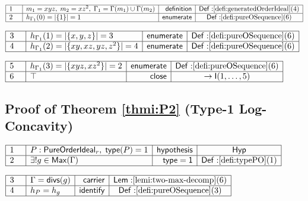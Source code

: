 \documentclass[11pt,reqno]{amsart}
\begin{document}
\noindent$%
\begin{array}{|m{0.5cm}|l|r|c|}
\hline
1 & m_{1}=xyz,\;m_{2}=xz^{2},\;\Gamma_{1}=\Gamma(m_{1})\cup\Gamma(m_{2}) & 
\mathsf{definition} & \mathsf{Def:}\ref{defi:generatedOrderIdeal}(4) \\ 
\hline
2 & h_{\Gamma_{1}}(0)=|\{1\}|=1 & \mathsf{enumerate} & \mathsf{Def:}\ref%
{defi:pureOSequence}(6) \\ \hline
\end{array}%
$

\nointerlineskip\noindent$%
\begin{array}{|m{0.5cm}|l|r|c|}
\hline
3 & h_{\Gamma_{1}}(1)=|\{x,y,z\}|=3 & \mathsf{enumerate} & \mathsf{Def:}\ref%
{defi:pureOSequence}(6) \\ \hline
4 & h_{\Gamma_{1}}(2)=|\{xy,xz,yz,z^{2}\}|=4 & \mathsf{enumerate} & \mathsf{%
Def:}\ref{defi:pureOSequence}(6) \\ \hline
\end{array}%
$

\nointerlineskip\noindent$%
\begin{array}{|m{0.5cm}|l|r|c|}
\hline
5 & h_{\Gamma_{1}}(3)=|\{xyz,xz^{2}\}|=2 & \mathsf{enumerate} & \mathsf{Def:}%
\ref{defi:pureOSequence}(6) \\ \hline
6 & \top & \mathsf{close} & \to\mathsf{I}(1,\dots,5) \\ \hline
\end{array}%
$

\medskip


\subsection*{Proof of Theorem \protect\ref{thmi:P2} (Type-1 Log-Concavity)}

\noindent$%
\begin{array}{|m{0.5cm}|l|r|c|}
\hline
1 & P:\mathsf{PureOrderIdeal}_{r},\;\mathsf{type}(P)=1 & \mathsf{hypothesis}
& \mathsf{Hyp} \\ \hline
2 & \exists!g\in\mathsf{Max}(\Gamma) & \mathsf{type=1} & \mathsf{Def:}\ref%
{defi:typePO}(1) \\ \hline
\end{array}%
$

\nointerlineskip\noindent$%
\begin{array}{|m{0.5cm}|l|r|c|}
\hline
3 & \Gamma=\mathsf{divs}(g) & \mathsf{carrier} & \mathsf{Lem:}\ref%
{lemi:two-max-decomp}(6) \\ \hline
4 & h_{P}=h_{g} & \mathsf{identify} & \mathsf{Def:}\ref{defi:pureOSequence}%
(3) \\ \hline
\end{array}%
$
\end{document}
